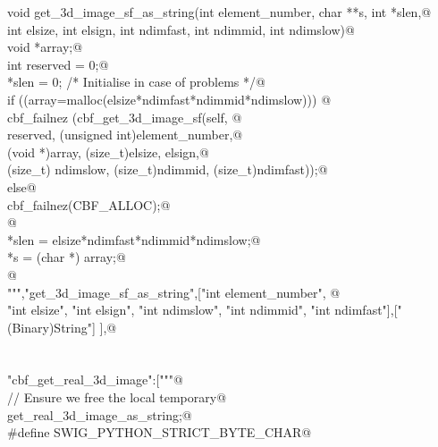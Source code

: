 \documentclass[10pt,a4paper,twoside,notitlepage]{article}
\begin{document}
\begin{flushleft}
\begin{list}{}{}
\mbox{}\verb@    void get_3d_image_sf_as_string(int element_number, char **s, int *slen,@\\
\mbox{}\verb@    int elsize, int elsign, int ndimfast, int ndimmid, int ndimslow){@\\
\mbox{}\verb@        void *array;@\\
\mbox{}\verb@        int reserved = 0;@\\
\mbox{}\verb@        *slen = 0; /* Initialise in case of problems */@\\
\mbox{}\verb@        if ((array=malloc(elsize*ndimfast*ndimmid*ndimslow))) {@\\
\mbox{}\verb@               cbf_failnez (cbf_get_3d_image_sf(self, @\\
\mbox{}\verb@               reserved, (unsigned int)element_number,@\\
\mbox{}\verb@               (void *)array, (size_t)elsize, elsign,@\\
\mbox{}\verb@               (size_t) ndimslow, (size_t)ndimmid, (size_t)ndimfast));@\\
\mbox{}\verb@         }else{@\\
\mbox{}\verb@               cbf_failnez(CBF_ALLOC);@\\
\mbox{}\verb@         }@\\
\mbox{}\verb@        *slen = elsize*ndimfast*ndimmid*ndimslow;@\\
\mbox{}\verb@        *s = (char *) array;@\\
\mbox{}\verb@      }@\\
\mbox{}\verb@""","get_3d_image_sf_as_string",["int element_number", @\\
\mbox{}\verb@    "int elsize", "int elsign", "int ndimslow", "int ndimmid", "int ndimfast"],["(Binary)String"] ],@\\
\mbox{}\verb@@\\
\mbox{}\verb@@\\
\mbox{}\verb@"cbf_get_real_3d_image":["""@\\
\mbox{}\verb@// Ensure we free the local temporary@\\
\mbox{}\verb@%cstring_output_allocate_size(char ** s, int *slen, free(*$1))@\\
\mbox{}\verb@       get_real_3d_image_as_string;@\\
\mbox{}\verb@%{@\\
\mbox{}\verb@#define SWIG_PYTHON_STRICT_BYTE_CHAR@\\
\mbox{}\verb@%}@\\
\mbox{}\verb@@\\

\end{list}
\end{flushleft}
\end{document}

